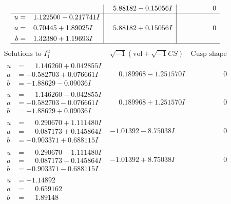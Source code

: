 \documentclass[1p]{elsarticle_modified}
\theoremstyle{definition}
\newcommand{\I}{\sqrt{-1}}
\begin{document}
$$\begin{array}{c|c|c}
 & \phantom{-}5.88182 - 0.15056 I & \phantom{-0.000000 } 0 \\ \hline\begin{aligned}
u &= \phantom{-}1.122500 - 0.217741 I \\
a &= \phantom{-}0.70445 + 1.89025 I \\
b &= \phantom{-}1.32380 + 1.19693 I\end{aligned}
 & \phantom{-}5.88182 + 0.15056 I & \phantom{-0.000000 } 0\\
 \hline 
 \end{array}$$\newpage$$\begin{array}{c|c|c}  
\text{Solutions to }I^u_{1}& \I (\text{vol} + \sqrt{-1}CS) & \text{Cusp shape}\\
 \hline 
\begin{aligned}
u &= \phantom{-}1.146260 + 0.042855 I \\
a &= -0.582703 + 0.076661 I \\
b &= -1.88629 - 0.09036 I\end{aligned}
 & \phantom{-}0.189968 - 1.251570 I & \phantom{-0.000000 } 0 \\ \hline\begin{aligned}
u &= \phantom{-}1.146260 - 0.042855 I \\
a &= -0.582703 - 0.076661 I \\
b &= -1.88629 + 0.09036 I\end{aligned}
 & \phantom{-}0.189968 + 1.251570 I & \phantom{-0.000000 } 0 \\ \hline\begin{aligned}
u &= \phantom{-}0.290670 + 1.111480 I \\
a &= \phantom{-}0.087173 + 0.145864 I \\
b &= -0.903371 + 0.688115 I\end{aligned}
 & -1.01392 - 8.75038 I & \phantom{-0.000000 } 0 \\ \hline\begin{aligned}
u &= \phantom{-}0.290670 - 1.111480 I \\
a &= \phantom{-}0.087173 - 0.145864 I \\
b &= -0.903371 - 0.688115 I\end{aligned}
 & -1.01392 + 8.75038 I & \phantom{-0.000000 } 0 \\ \hline\begin{aligned}
u &= -1.14892\phantom{ +0.000000I} \\
a &= \phantom{-}0.659162\phantom{ +0.000000I} \\
b &= \phantom{-}1.89148\phantom{ +0.000000I}\end{aligned}

\end{array}$$
\end{document}
